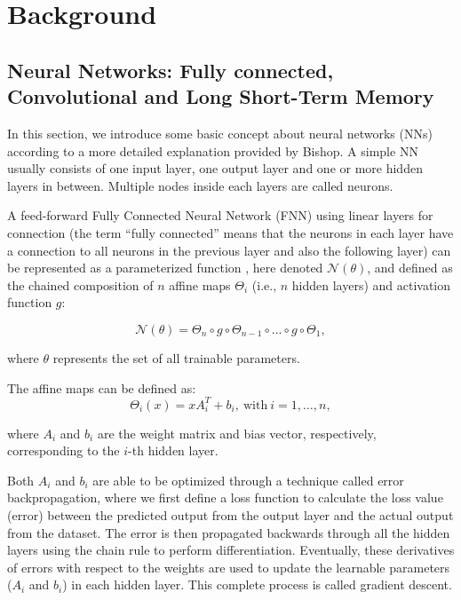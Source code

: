 \chapter{Background}\label{chap:background}


\section{Neural Networks: Fully connected, Convolutional and Long Short-Term Memory}

In this section, we introduce some basic concept about neural networks (NNs) according to a more detailed explanation provided by Bishop. \citep{10.1117_1.2819119} A simple NN usually consists of one input layer, one output layer and one or more hidden layers in between. Multiple nodes inside each layers are called neurons. 

A feed-forward Fully Connected Neural Network (FNN) using linear layers for connection (the term “fully connected” means that the neurons in each layer have a connection to all neurons in the previous layer and also the following layer) can be represented as a parameterized function \citep{2306.06304}, here denoted $\mathcal{N}(\theta)$, and defined as the chained composition of $n$ affine maps $\Theta_i$ (i.e., $n$ hidden layers) and activation function $g$:

\begin{equation*}
\mathcal{N}(\theta) = \Theta_n \circ g \circ \Theta_{n-1} \circ \ldots \circ g \circ \Theta_1,
\end{equation*}

where $\theta$ represents the set of all trainable parameters.

The affine maps can be defined as:
\begin{equation*} 
\Theta_i(x) = xA_i^{T} + b_i, \ \mathrm{with} \ i=1,\ldots,n, 
\end{equation*}

where $A_i$ and $b_i$ are the weight matrix and bias vector, respectively, corresponding to the $i$-th hidden layer.

Both $A_i$ and $b_i$ are able to be optimized through a technique called error backpropagation, where we first define a loss function to calculate the loss value (error) between the predicted output from the output layer and the actual output from the dataset. The error is then propagated backwards through all the hidden layers using the chain rule to perform differentiation. Eventually, these derivatives of errors with respect to the weights are used to update the learnable parameters ($A_i$ and $b_i$) in each hidden layer. This complete process is called gradient descent. 


